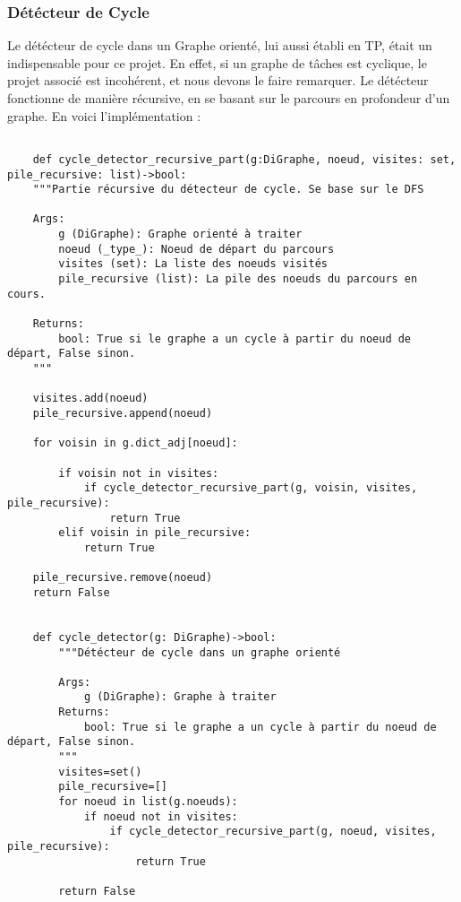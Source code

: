 \documentclass{article}
\begin{document}
\subsubsection{Détécteur de Cycle}

Le détécteur de cycle dans un Graphe orienté, lui aussi établi en TP,
était un indispensable pour ce projet. En effet, si un graphe de tâches est cyclique,
le projet associé est incohérent, et nous devons le faire remarquer.
Le détécteur fonctionne de manière récursive, en se basant sur le parcours en profondeur d'un graphe.
En voici l'implémentation :

\begin{verbatim}

    def cycle_detector_recursive_part(g:DiGraphe, noeud, visites: set, pile_recursive: list)->bool:
    """Partie récursive du détecteur de cycle. Se base sur le DFS

    Args:
        g (DiGraphe): Graphe orienté à traiter
        noeud (_type_): Noeud de départ du parcours
        visites (set): La liste des noeuds visités
        pile_recursive (list): La pile des noeuds du parcours en cours.

    Returns:
        bool: True si le graphe a un cycle à partir du noeud de départ, False sinon.
    """
        
    visites.add(noeud)
    pile_recursive.append(noeud)

    for voisin in g.dict_adj[noeud]:
        
        if voisin not in visites:
            if cycle_detector_recursive_part(g, voisin, visites, pile_recursive):
                return True
        elif voisin in pile_recursive:
            return True

    pile_recursive.remove(noeud)
    return False


    def cycle_detector(g: DiGraphe)->bool:
        """Détécteur de cycle dans un graphe orienté

        Args:
            g (DiGraphe): Graphe à traiter
        Returns:
            bool: True si le graphe a un cycle à partir du noeud de départ, False sinon.
        """
        visites=set()
        pile_recursive=[]
        for noeud in list(g.noeuds):
            if noeud not in visites:
                if cycle_detector_recursive_part(g, noeud, visites, pile_recursive):
                    return True
                
        return False
\end{verbatim}
\end{document}

